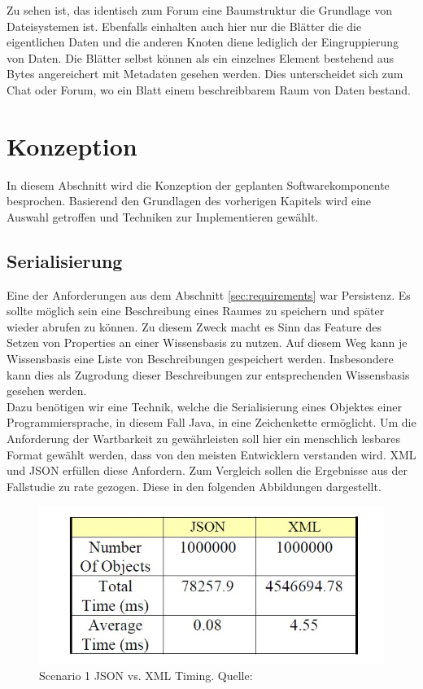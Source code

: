 \documentclass[a4paper]{article}
\begin{document}
	Zu sehen ist, das identisch zum Forum eine Baumstruktur die Grundlage von
	Dateisystemen ist. Ebenfalls einhalten auch hier nur die Blätter die
	die eigentlichen Daten und die anderen Knoten diene lediglich
	der Eingruppierung von Daten. Die Blätter selbst können als ein einzelnes
	Element bestehend aus Bytes angereichert mit Metadaten gesehen werden.
	Dies unterscheidet sich zum Chat oder Forum, wo ein Blatt einem beschreibbarem
	Raum von Daten bestand. 
		
	\newpage
	
	\section{Konzeption}	
	
	In diesem Abschnitt wird die Konzeption der geplanten Softwarekomponente
	besprochen. Basierend den Grundlagen des vorherigen Kapitels wird eine
	Auswahl getroffen und Techniken zur Implementieren gewählt.
	
	\subsection{Serialisierung}
	\label{sec:konz_serialisierung}
	
	Eine der Anforderungen aus dem Abschnitt \ref{sec:requirements} war Persistenz.
	Es sollte möglich sein eine Beschreibung eines Raumes zu speichern und später
	wieder abrufen zu können. Zu diesem Zweck macht es Sinn das Feature des Setzen
	von Properties an einer Wissensbasis zu nutzen. Auf diesem Weg kann je 
	Wissensbasis eine Liste von Beschreibungen gespeichert werden. Insbesondere
	kann dies als Zugrodung dieser Beschreibungen zur entsprechenden Wissensbasis
	gesehen werden. \\
	
	Dazu benötigen wir eine Technik, welche die Serialisierung eines Objektes einer
	Programmiersprache, in diesem Fall Java, in eine Zeichenkette ermöglicht. Um
	die Anforderung der Wartbarkeit zu gewährleisten soll hier ein menschlich
	lesbares Format gewählt werden, dass von den meisten Entwicklern verstanden
	wird. XML und JSON erfüllen diese Anfordern. Zum Vergleich sollen die
	Ergebnisse aus der Fallstudie \cite{XmlJson} zu rate gezogen. Diese in den
	folgenden Abbildungen dargestellt.
	
	\begin{figure}[H] 
		\includegraphics[width=\linewidth]{../Bilder/xml_json_time_sen1.jpg}
		\caption{Scenario 1 JSON vs. XML Timing. Quelle: \cite{XmlJson}}
		\label{fig:xml_json_time_sen1}
	\end{figure}
	
\end{document}
